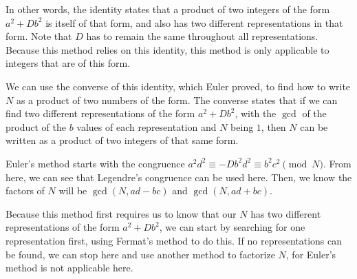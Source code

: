 \documentclass{article}
\begin{document}
\par In other words, the identity states that a product of two integers of the form $a^2+Db^2$ is itself of that form,
and also has two different representations in that form. Note that $D$ has to remain the same throughout all representations.
Because this method relies on this identity, this method is only applicable to integers that are of this form.

\par We can use the converse of this identity, which Euler proved, to find how to write $N$ as a product of two numbers
of the form. The converse states that if we can find two different representations of the form $a^2+Db^2$, with the $\gcd$
of the product of the $b$ values of each representation and $N$ being $1$, then $N$ can be written as a product of two integers of that same form.

\par Euler's method starts with the congruence $a^2d^2 \equiv -Db^2d^2 \equiv b^2c^2 \pmod{N}$. From here, we can see that
Legendre's congruence can be used here. Then, we know the factors of $N$ will be $\gcd(N, ad-bc)$ and $\gcd(N,ad+bc)$.

\par Because this method first requires us to know that our $N$ has two different representations of the form $a^2+Db^2$,
we can start by searching for one representation first, using Fermat's method to do this. If no representations can
be found, we can stop here and use another method to factorize $N$, for Euler's method is not applicable here.
\end{document}
